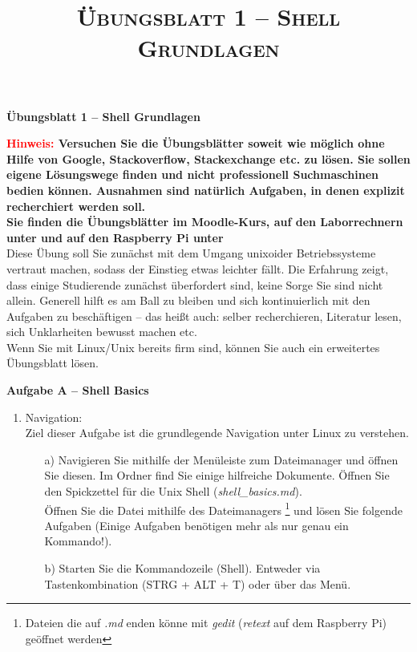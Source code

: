 \documentclass[paper=a4,fontsize=11pt]{scrartcl}%
\title{	
\normalfont \normalsize 
\textsc{Übungsblatt 1 -- Shell Grundlagen}
}
\numberwithin{equation}{section}
\begin{document}
\begin{center}
\Large{\textbf{Übungsblatt 1 -- Shell Grundlagen}}
\end{center}
\large{\textbf{\textcolor{red}{Hinweis:} Versuchen Sie die Übungsblätter soweit wie möglich ohne Hilfe von Google, Stackoverflow, Stackexchange etc. zu lösen. Sie sollen eigene Lösungswege finden und nicht professionell Suchmaschinen bedien können. Ausnahmen sind natürlich Aufgaben, in denen explizit recherchiert werden soll.}\\
\textbf{Sie finden die Übungsblätter im Moodle-Kurs, auf den Laborrechnern unter  und auf den Raspberry Pi unter }\\
Diese Übung soll Sie zunächst mit dem Umgang unixoider Betriebssysteme vertraut machen, sodass der Einstieg etwas leichter fällt. Die Erfahrung zeigt, dass einige Studierende zunächst überfordert sind, keine Sorge Sie sind nicht allein. Generell hilft es am Ball zu bleiben und sich kontinuierlich mit den Aufgaben zu beschäftigen -- das heißt auch: selber recherchieren, Literatur lesen, sich Unklarheiten bewusst machen etc.\\
Wenn Sie mit Linux/Unix bereits firm sind, können Sie auch ein erweitertes Übungsblatt lösen.
\begin{center}\Large{\textbf{Aufgabe A -- Shell Basics}}\end{center}\vskip0.25in
\begin{enumerate}
\item Navigation:\\
Ziel dieser Aufgabe ist die grundlegende Navigation unter Linux zu verstehen.
	\begin{itemize}
		\item[a)] Navigieren Sie mithilfe der Menüleiste zum Dateimanager und öffnen Sie diesen. Im Ordner  find Sie einige hilfreiche Dokumente. Öffnen Sie den Spickzettel für die Unix Shell (\emph{shell\_basics.md}).\\
Öffnen Sie die Datei mithilfe des Dateimanagers \footnote{Dateien die auf \emph{.md} enden könne mit \emph{gedit} (\emph{retext} auf dem Raspberry Pi) geöffnet werden} und lösen Sie folgende Aufgaben (Einige Aufgaben benötigen mehr als nur genau ein Kommando!).
		\item[b)] Starten Sie die Kommandozeile (Shell). Entweder via Tastenkombination  (STRG + ALT + T) oder über das Menü.\\

\end{itemize}
\end{enumerate}}
\end{document}
